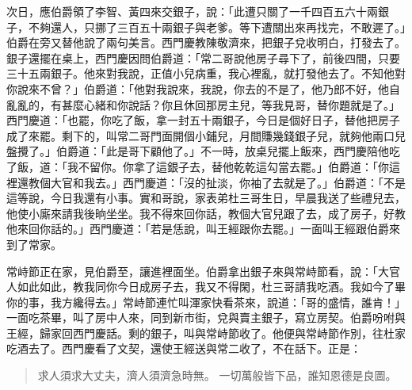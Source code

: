 次日，應伯爵領了李智、黃四來交銀子，說：「此遭只關了一千四百五六十兩銀子，不夠還人，只挪了三百五十兩銀子與老爹。等下遭關出來再找完，不敢遲了。」伯爵在旁又替他說了兩句美言。西門慶教陳敬濟來，把銀子兌收明白，打發去了。銀子還擺在桌上，西門慶因問伯爵道：「常二哥說他房子尋下了，前後四間，只要三十五兩銀子。他來對我說，正值小兒病重，我心裡亂，就打發他去了。不知他對你說來不曾？」伯爵道：「他對我說來，我說，你去的不是了，他乃郎不好，他自亂亂的，有甚麼心緒和你說話？你且休回那房主兒，等我見哥，替你題就是了。」西門慶道：「也罷，你吃了飯，拿一封五十兩銀子，今日是個好日子，替他把房子成了來罷。剩下的，叫常二哥門面開個小鋪兒，月間賺幾錢銀子兒，就夠他兩口兒盤攪了。」伯爵道：「此是哥下顧他了。」不一時，放桌兒擺上飯來，西門慶陪他吃了飯，道：「我不留你。你拿了這銀子去，替他乾乾這勾當去罷。」伯爵道：「你這裡還教個大官和我去。」西門慶道：「沒的扯淡，你袖了去就是了。」伯爵道：「不是這等說，今日我還有小事。實和哥說，家表弟杜三哥生日，早晨我送了些禮兒去，他使小廝來請我後晌坐坐。我不得來回你話，教個大官兒跟了去，成了房子，好教他來回你話的。」西門慶道：「若是恁說，叫王經跟你去罷。」一面叫王經跟伯爵來到了常家。

常峙節正在家，見伯爵至，讓進裡面坐。伯爵拿出銀子來與常峙節看，說：「大官人如此如此，教我同你今日成房子去，我又不得閑，杜三哥請我吃酒。我如今了畢你的事，我方纔得去。」常峙節連忙叫渾家快看茶來，說道：「哥的盛情，誰肯！」一面吃茶畢，叫了房中人來，同到新市街，兌與賣主銀子，寫立房契。伯爵吩咐與王經，歸家回西門慶話。剩的銀子，叫與常峙節收了。他便與常峙節作別，往杜家吃酒去了。西門慶看了文契，還使王經送與常二收了，不在話下。正是：
\begin{quote}
求人須求大丈夫，濟人須濟急時無。
一切萬般皆下品，誰知恩德是良圖。
\end{quote}
